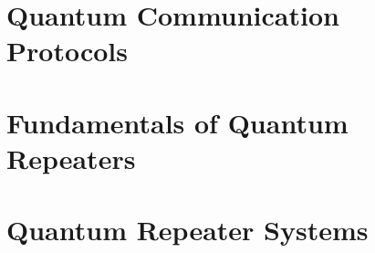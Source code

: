 \documentclass[6x9]{newmath}
\begin{document}
\part{Quantum Communication Protocols}





\part{Fundamentals of Quantum Repeaters}





\part{Quantum Repeater Systems}




\endmatter
%
%

\nocite{*}



\printindex
\onecolumn
% 
\end{document}
